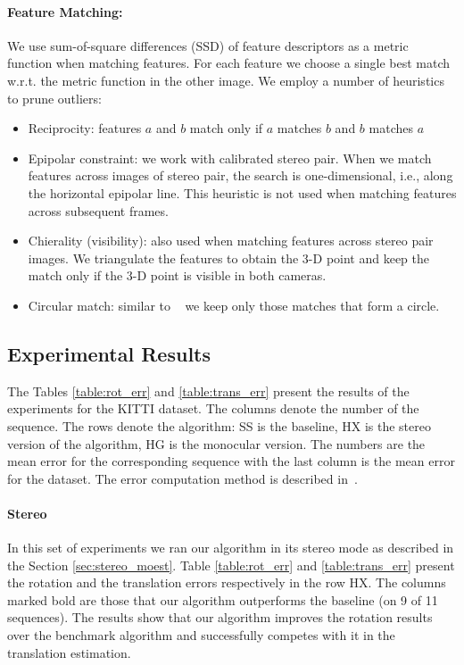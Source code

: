 \paragraph{Feature Matching:} We use sum-of-square differences (SSD)
of feature descriptors as a metric function when matching
features. For each feature we choose a single best match w.r.t. the
metric function in the other image. We employ a number of heuristics
to prune outliers:
\begin{itemize}
\item Reciprocity: features $a$ and $b$ match only if $a$ matches $b$
  and $b$ matches $a$
\item Epipolar constraint: we work with calibrated stereo pair.  When
  we match features across images of stereo pair, the search is
  one-dimensional, i.e., along the horizontal epipolar line.  This
  heuristic is not used when matching features across subsequent
  frames.
\item Chierality (visibility): also used when matching features across
  stereo pair images.  We triangulate the features to obtain the 3-D
  point and keep the match only if the 3-D point is visible in both
  cameras.
\item Circular match: similar to ~\cite{Geiger2011} we keep only those
  matches that form a circle.
\end{itemize}

\subsection{Experimental Results}

The Tables \ref{table:rot_err} and \ref{table:trans_err} present the
results of the experiments for the KITTI dataset. The columns denote
the number of the sequence.  The rows denote the algorithm: SS is the
baseline, HX is the stereo version of the algorithm, HG is the
monocular version.  The numbers are the mean error for the
corresponding sequence with the last column is the mean error for the
dataset. The error computation method is described
in~\cite{Geiger2012}.

\paragraph{Stereo} In this set of experiments we ran our algorithm in
its stereo mode as described in the Section \ref{sec:stereo_moest}.
Table \ref{table:rot_err} and \ref{table:trans_err} present the
rotation and the translation errors respectively in the row HX. The
columns marked bold are those that our algorithm outperforms the
baseline (on 9 of 11 sequences). The results show that our algorithm improves the
rotation results over the benchmark algorithm and successfully
competes with it in the translation estimation.

